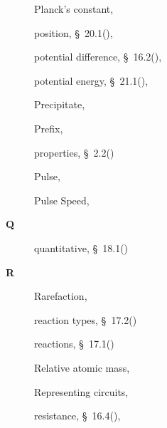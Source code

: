\begin{multicols}{2}
{\begin{description}
	  \item[] \noindent\raggedright Planck's constant,  \pageref{id2454271}
	  
	  \item[] \noindent\raggedright position,  \S~20.1(\pageref{m38787}),  \pageref{id2526538}
	  
	  \item[] \noindent\raggedright potential difference,  \S~16.2(\pageref{m38772}),  \pageref{id2479718}
	  
	  \item[] \noindent\raggedright potential energy,  \S~21.1(\pageref{m38784}),  \pageref{id2552726}
	  
	  \item[] \noindent\raggedright Precipitate,  \pageref{id2493039}
	  
	  \item[] \noindent\raggedright Prefix,  \pageref{id2402460}
	  
	  \item[] \noindent\raggedright properties,  \S~2.2(\pageref{m38734})
	  
	  \item[] \noindent\raggedright Pulse,  \pageref{id2434846}
	  
	  \item[] \noindent\raggedright Pulse Speed,  \pageref{id2435275}
	  \vspace{.3cm}
	  \item[{\large \bfseries Q}]\noindent\raggedright
	  quantitative,  \S~18.1(\pageref{m38717})
	  \vspace{.3cm}
	  \item[{\large \bfseries R}]\noindent\raggedright
	  Rarefaction,  \pageref{id2399653}
	  
	  \item[] \noindent\raggedright reaction types,  \S~17.2(\pageref{m38719})
	  
	  \item[] \noindent\raggedright reactions,  \S~17.1(\pageref{m38720})
	  
	  \item[] \noindent\raggedright Relative atomic mass,  \pageref{id2415700}
	  
	  \item[] \noindent\raggedright Representing circuits,  \pageref{id2478537}
	  
	  \item[] \noindent\raggedright resistance,  \S~16.4(\pageref{m38776}),  \pageref{id2485077}
	  

\end{description}}
\end{multicols}
